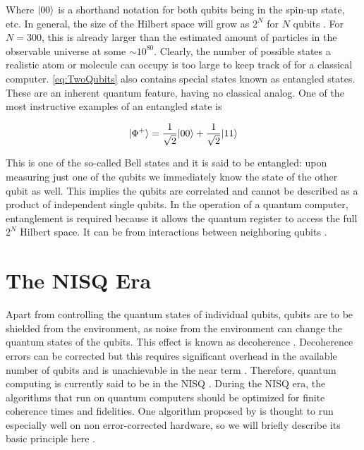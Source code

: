 Where $\lvert00\rangle$ is a shorthand notation for both qubits being in the spin-up state, etc.
In general, the size of the Hilbert space will grow as $2^N$ for $N$ qubits \cite{Nielsen2011,Henriet2020}. 
For $N=300$, this is already larger than the estimated amount of particles in the observable universe at some $\sim 10^{80}$. 
Clearly, the number of possible states a realistic atom or molecule can occupy is too large to keep track of for a classical computer.
\cref{eq:TwoQubits} also contains special states known as entangled states. 
These are an inherent quantum feature, having no classical analog.
One of the most instructive examples of an entangled state is 

\begin{equation}\label{eq:Entangled}
	\lvert\Phi^+\rangle = \frac{1}{\sqrt{2}} \lvert00\rangle+ \frac{1}{\sqrt{2}} \lvert11\rangle
\end{equation}

This is one of the so-called Bell states \cite{Nielsen2011} and it is said to be entangled: upon measuring just one of the qubits we immediately know the state of the other qubit as well.
This implies the qubits are correlated and cannot be described as a product of independent single qubits.
In the operation of a quantum computer, entanglement is required because it allows the quantum register to access the full $2^N$ Hilbert space.
It can be from interactions between neighboring qubits \cite{Henriet2020}.

\section{The NISQ Era}

Apart from controlling the quantum states of individual qubits, qubits are to be shielded from the environment, as noise from the environment can change the quantum states of the qubits. 
This effect is known as decoherence \cite{DiVincenzo2000}. Decoherence errors can be corrected but this requires significant overhead in the available number of qubits and is unachievable in the near term \cite{Peres1985,Ladd2010}. 
Therefore, quantum computing is currently said to be in the \ac{NISQ} \cite{Preskill2018}.
During the NISQ era, the algorithms that run on quantum computers should be optimized for finite coherence times and fidelities. 
One algorithm proposed by \cite{Peruzzo2014} is thought to run especially well on non error-corrected hardware, so we will briefly describe its basic principle here \cite{McClean2016}. 

